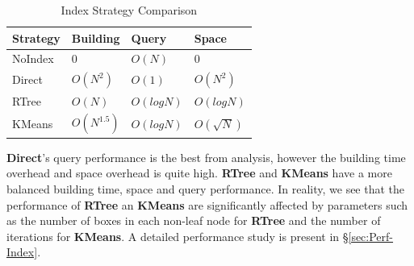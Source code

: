 \documentclass{sig-alternate}
\begin{document}
\begin{table}[ht]
\begin{center}
    \caption{Index Strategy Comparison}
    \begin{scriptsize}
    \begin{tabular}{ | p{1.75cm} | p{1.75cm} | p{1.75cm} | p{1.75cm} |}
    \hline
    Strategy & Building & Query & Space \\ \hline \hline
    NoIndex & 0 & $O(N)$ & 0 \\ \hline
    Direct & $O(N^2)$ & $O(1)$ & $O(N^2)$ \\ \hline
    RTree & $O(N)$ & $O(logN)$ & $O(logN)$ \\ \hline
    KMeans & $O(N^{1.5})$ & $O(logN)$ & $O(\sqrt{N})$ \\ \hline
    \end{tabular}
    \end{scriptsize}
    \label{tb:index-comparison}
\end{center}   
\end{table}

{\bf Direct}'s query performance is the best from analysis, however the building time overhead and space overhead is quite high.
{\bf RTree} and {\bf KMeans} have a more balanced building time, space and query performance.
In reality, we see that the performance of {\bf RTree} an {\bf KMeans} are significantly affected by parameters such as the
number of boxes in each non-leaf node for {\bf RTree} and the number of iterations for {\bf KMeans}.
A detailed performance study is present in \S\ref{sec:Perf-Index}.

\end{document}
